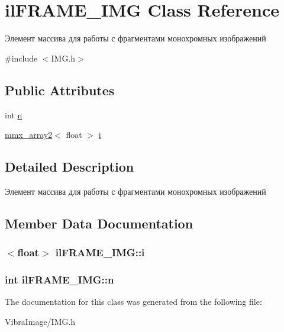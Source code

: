 \hypertarget{classil_f_r_a_m_e___i_m_g}{\section{il\+F\+R\+A\+M\+E\+\_\+\+I\+M\+G Class Reference}
\label{classil_f_r_a_m_e___i_m_g}
}


Элемент массива для работы с фрагментами монохромных изображений  




{\ttfamily \#include $<$I\+M\+G.\+h$>$}

\subsection*{Public Attributes}
\begin{DoxyCompactItemize}
\item 
int \hyperlink{classil_f_r_a_m_e___i_m_g_a7925038521929135a49e1796a9703c5c}{n}
\item 
\hyperlink{classmmx__array2}{mmx\+\_\+array2}$<$ float $>$ \hyperlink{classil_f_r_a_m_e___i_m_g_ab40e301cbcb470f71bcf09db85dacccf}{i}
\end{DoxyCompactItemize}


\subsection{Detailed Description}
Элемент массива для работы с фрагментами монохромных изображений 



\subsection{Member Data Documentation}
\hypertarget{classil_f_r_a_m_e___i_m_g_ab40e301cbcb470f71bcf09db85dacccf}{
\subsubsection[{i}]{$<$float$>$ il\+F\+R\+A\+M\+E\+\_\+\+I\+M\+G\+::i}}\label{classil_f_r_a_m_e___i_m_g_ab40e301cbcb470f71bcf09db85dacccf}




\hypertarget{classil_f_r_a_m_e___i_m_g_a7925038521929135a49e1796a9703c5c}{
\subsubsection[{n}]{\setlength{\rightskip}{0pt plus 5cm}int il\+F\+R\+A\+M\+E\+\_\+\+I\+M\+G\+::n}}\label{classil_f_r_a_m_e___i_m_g_a7925038521929135a49e1796a9703c5c}






The documentation for this class was generated from the following file\+:\begin{DoxyCompactItemize}
\item 
Vibra\+Image/I\+M\+G.\+h\end{DoxyCompactItemize}
